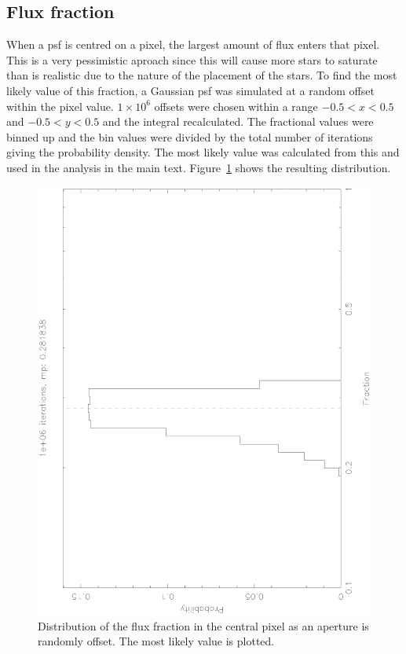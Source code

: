 \documentclass[11pt,a4paper]{report}
\begin{document}
\begin{appendices}
\section{Flux fraction}
\label{sec:ffraction}

When a psf is centred on a pixel, the largest amount of flux enters that
pixel. This is a very pessimistic aproach since this will cause more
stars to saturate than is realistic due to the nature of the placement
of the stars. To find the most likely value of this fraction, a Gaussian
psf was simulated at a random offset within the pixel value.
$1\times10^6$ offsets were chosen within a range $-0.5 < x < 0.5$ and
$-0.5 < y < 0.5$ and the integral recalculated. The fractional values
were binned up and the bin values were divided by the total number of
iterations giving the probability density. The most likely value was
calculated from this and used in the analysis in the main text.
Figure~\ref{fig:fractiondistribution} shows the resulting distribution.

\begin{figure}
    \begin{center}
        \includegraphics[angle=270,width=0.9\columnwidth]{images/fractiondistribution}
    \end{center}
    \caption{Distribution of the flux fraction in the central pixel as
    an aperture is randomly offset. The most likely value is plotted.}
    \label{fig:fractiondistribution}
\end{figure}


\end{appendices}
\end{document}
